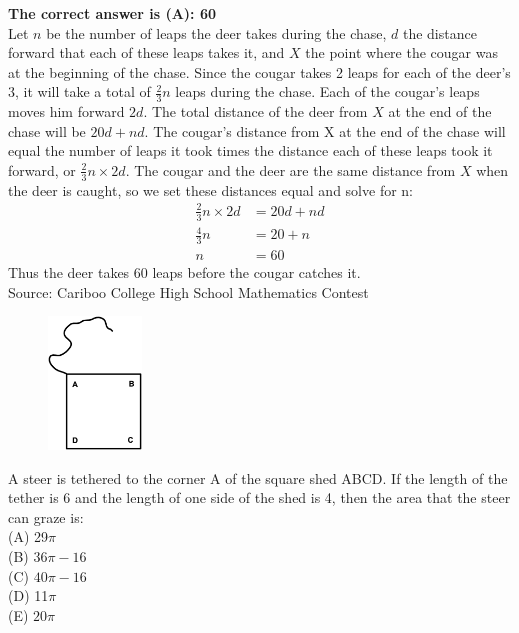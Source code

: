 \documentclass{article}
\begin{document}
\textbf{The correct answer is (A): 60}\\[1 ex]
Let $n$ be the number of leaps the deer takes during the chase, $d$ the distance forward that each of these leaps takes it, and $X$ the point where the cougar was at the beginning of the chase. Since the cougar takes 2 leaps for each of the deer's 3, it will take a total of $\frac{2}{3}n$ leaps during the chase. Each of the cougar's leaps moves him forward $2d$. The total distance of the deer from $X$ at the end of the chase will be $20d+nd$. The cougar's distance from X at the end of the chase will equal the number of leaps it took times the distance each of these leaps took it forward, or $\frac{2}{3}n\times 2d$. The cougar and the deer are the same distance from $X$ when the deer is caught, so we set these distances equal and solve for n:
\begin{align*}
\frac{2}{3}n\times2d&=20d+nd\\
\frac{4}{3}n&=20+n\\
n&=60
\end{align*}
Thus the deer takes 60 leaps before the cougar catches it.
\\[5 ex]

\scriptsize
Source: Cariboo College High School Mathematics Contest

\normalsize
\begin{figure}
	\includegraphics[width=25mm,viewport=127 34 519 586]{CCJPR73-24pic1.eps}
\end{figure}
A steer is tethered to the corner A of the square shed ABCD. If the length of the tether is 6 and the length of one side of the shed is 4, then the area that the steer can graze is:\\
(A) 29$\pi$\\
(B) $36\pi-16$\\
(C) $40\pi-16$\\
(D) 11$\pi$\\
(E) $20\pi$\\
\end{document}
